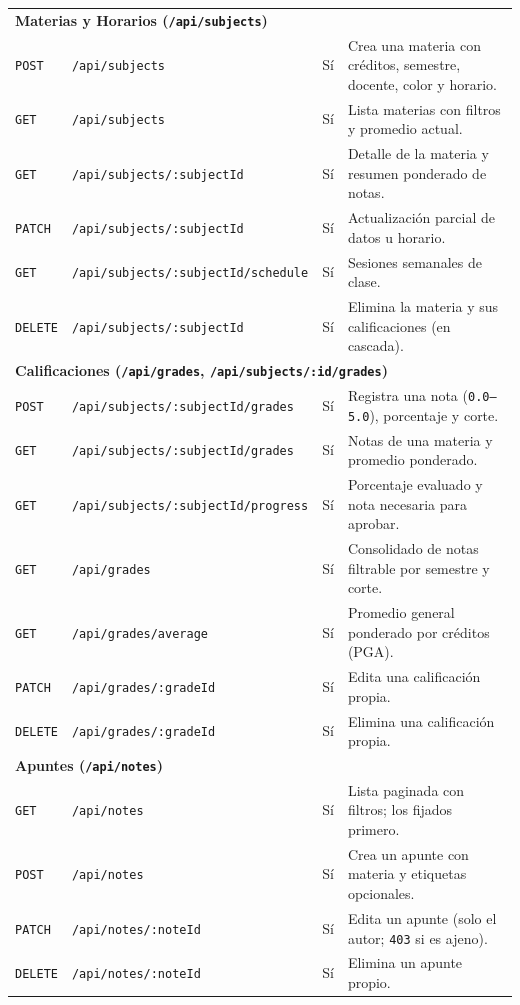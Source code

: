 \documentclass[11pt,letterpaper]{article}
\begin{document}
{\begin{longtable}{l >{\raggedright\arraybackslash}p{5.6cm} c >{\raggedright\arraybackslash}p{5.4cm}}
  \multicolumn{4}{l}{\textbf{\textcolor{carmesiOscuroA}{Materias y Horarios (\texttt{/api/subjects})}}} \\
  \texttt{POST} & \texttt{/api/subjects} & Sí & Crea una materia con créditos, semestre, docente, color y horario. \\
  \texttt{GET} & \texttt{/api/subjects} & Sí & Lista materias con filtros y promedio actual. \\
  \texttt{GET} & \texttt{/api/subjects/:subjectId} & Sí & Detalle de la materia y resumen ponderado de notas. \\
  \texttt{PATCH} & \texttt{/api/subjects/:subjectId} & Sí & Actualización parcial de datos u horario. \\
  \texttt{GET} & \texttt{/api/subjects/:subjectId/schedule} & Sí & Sesiones semanales de clase. \\
  \texttt{DELETE} & \texttt{/api/subjects/:subjectId} & Sí & Elimina la materia y sus calificaciones (en cascada). \\
  \midrule

  \multicolumn{4}{l}{\textbf{\textcolor{carmesiOscuroA}{Calificaciones (\texttt{/api/grades}, \texttt{/api/subjects/:id/grades})}}} \\
  \texttt{POST} & \texttt{/api/subjects/:subjectId/grades} & Sí & Registra una nota (\texttt{0.0--5.0}), porcentaje y corte. \\
  \texttt{GET} & \texttt{/api/subjects/:subjectId/grades} & Sí & Notas de una materia y promedio ponderado. \\
  \texttt{GET} & \texttt{/api/subjects/:subjectId/progress} & Sí & Porcentaje evaluado y nota necesaria para aprobar. \\
  \texttt{GET} & \texttt{/api/grades} & Sí & Consolidado de notas filtrable por semestre y corte. \\
  \texttt{GET} & \texttt{/api/grades/average} & Sí & Promedio general ponderado por créditos (PGA). \\
  \texttt{PATCH} & \texttt{/api/grades/:gradeId} & Sí & Edita una calificación propia. \\
  \texttt{DELETE} & \texttt{/api/grades/:gradeId} & Sí & Elimina una calificación propia. \\
  \midrule

  \multicolumn{4}{l}{\textbf{\textcolor{carmesiOscuroA}{Apuntes (\texttt{/api/notes})}}} \\
  \texttt{GET} & \texttt{/api/notes} & Sí & Lista paginada con filtros; los fijados primero. \\
  \texttt{POST} & \texttt{/api/notes} & Sí & Crea un apunte con materia y etiquetas opcionales. \\
  \texttt{PATCH} & \texttt{/api/notes/:noteId} & Sí & Edita un apunte (solo el autor; \texttt{403} si es ajeno). \\
  \texttt{DELETE} & \texttt{/api/notes/:noteId} & Sí & Elimina un apunte propio. \\
  \midrule


\end{longtable}}
\end{document}
